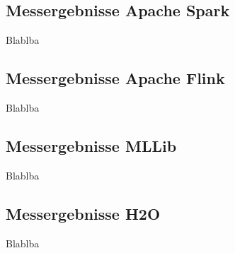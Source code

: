 \subsection{Messergebnisse Apache Spark}
\label{section:spark eval}

Blablba

\subsection{Messergebnisse Apache Flink}
\label{section:mllib arch}

Blablba

\subsection{Messergebnisse MLLib}
\label{section:mllib arch}

Blablba

\subsection{Messergebnisse H2O}
\label{section:mllib arch}

Blablba

